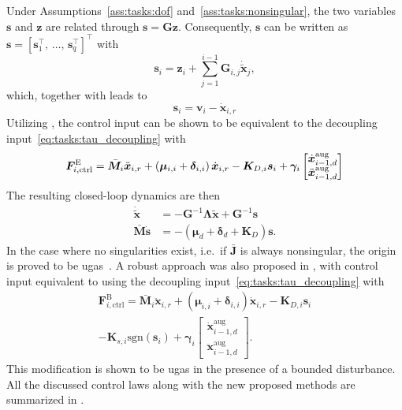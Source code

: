 \documentclass[../main.tex]{subfiles}
\begin{document}
Under Assumptions~\ref{ass:tasks:dof} and~\ref{ass:tasks:nonsingular}, the two variables $\bm{s}$ and $\bm{z}$ are related through $\bm{s} = \bm{G} \bm{z}$. Consequently, $\bm{s}$ can be written as $\bm{s} = [\bm{s}_1^\top,\, \ldots,\, \bm{s}_q^\top]^\top$ with
\begin{equation}\label{eq:comp:si}
    \bm{s}_i = \bm{z}_i + \sum_{j=1}^{i-1} \bm{G}_{i,j} \dot{\tilde{\bm{x}}}_{j},
\end{equation}
which, together with  leads to
\begin{equation}\label{eq:tasks:s_v_xr}
    \bm{s}_i = \bm{v}_i - \dot{\bm{x}}_{i,r}
\end{equation}
Utilizing , the control input  can be shown to be equivalent to the decoupling input~\eqref{eq:tasks:tau_decoupling} with
\begin{equation}
    \bm{F}_{i, {\rm ctrl}}^{\textrm{E}} = \bar{\bm{M}}_i \ddot{\bm{x}}_{i,r} + \left( \bm{\mu}_{i,i} + \bm{\delta}_{i,i} \right) \dot{\bm{x}}_{i,r} - \bm{K}_{D,i} \bm{s}_i
    + \bm{\gamma}_i
    \begin{bmatrix} \dot{\bm{x}}^{\textrm{aug}}_{i-1,d} \\ \ddot{\bm{x}}^{\textrm{aug}}_{i-1,d}
    \end{bmatrix}
\end{equation}
The resulting closed-loop dynamics are then
\begin{subequations}\label{eq:tasks:CL_Garofalo}
    \begin{align}
        \dot{\tilde{\bm{x}}} &= - \bm{G}^{-1} \bm{\Lambda} \tilde{\bm{x}} + \bm{G}^{-1} \bm{s} \label{eq:tasks:CL_Garofalo_xtildedot}\\
        \bar{\bm{M}} \dot{\bm{s}} &= - \left( \bm{\mu}_d + \bm{\delta}_d + \bm{K}_D \right) \bm{s}. \label{eq:tasks:CL_Garofalo_sdot}
    \end{align}
\end{subequations}
In the case where no singularities exist, i.e.~if $\bar{\bm{J}}$ is always nonsingular,  the origin is proved to be \gls{ugas}~\cite{Garofalo2020,DyrhaugTveter2023}. A robust approach was also proposed in \cite{DyrhaugTveter2023}, with control input equivalent to using the decoupling input~\eqref{eq:tasks:tau_decoupling} with
\begin{multline}\label{eq:comp:Fictrl_SM}
    \bm{F}_{i,\textrm{ctrl}}^{\textrm{B}} = \bar{\bm{M}}_i \ddot{\bm{x}}_{i,r} + \left( \bm{\mu}_{i,i} + \bm{\delta}_{i,i} \right) \dot{\bm{x}}_{i,r} - \bm{K}_{D,i} \bm{s}_i \\
    - \bm{K}_{s,i} \textrm{sgn} (\bm{s}_i) + \bm{\gamma}_i
    \begin{bmatrix} \dot{\bm{x}}^{\textrm{aug}}_{i-1,d} \\ \ddot{\bm{x}}^{\textrm{aug}}_{i-1,d}
    \end{bmatrix}.
\end{multline}
This modification is shown to be \gls{ugas} in the presence of a bounded disturbance. All the discussed control laws along with the new proposed methods are summarized in .
\end{document}
